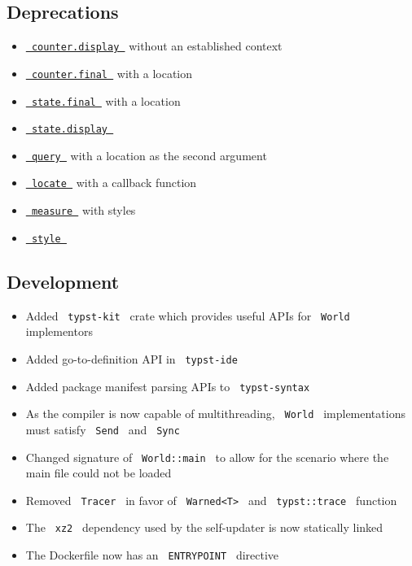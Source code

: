 \subsection{Deprecations}\label{deprecations}

\begin{itemize}
\tightlist
\item
  \href{/docs/reference/introspection/counter/\#definitions-display}{\texttt{\ counter.display\ }}
  without an established context
\item
  \href{/docs/reference/introspection/counter/\#definitions-final}{\texttt{\ counter.final\ }}
  with a location
\item
  \href{/docs/reference/introspection/state/\#definitions-final}{\texttt{\ state.final\ }}
  with a location
\item
  \href{/docs/reference/introspection/state/\#definitions-display}{\texttt{\ state.display\ }}
\item
  \href{/docs/reference/introspection/query/}{\texttt{\ query\ }} with a
  location as the second argument
\item
  \href{/docs/reference/introspection/locate/}{\texttt{\ locate\ }} with
  a callback function
\item
  \href{/docs/reference/layout/measure/}{\texttt{\ measure\ }} with
  styles
\item
  \href{/docs/reference/foundations/style/}{\texttt{\ style\ }}
\end{itemize}

\subsection{Development}\label{development}

\begin{itemize}
\tightlist
\item
  Added \texttt{\ typst-kit\ } crate which provides useful APIs for
  \texttt{\ World\ } implementors
\item
  Added go-to-definition API in \texttt{\ typst-ide\ }
\item
  Added package manifest parsing APIs to \texttt{\ typst-syntax\ }
\item
  As the compiler is now capable of multithreading, \texttt{\ World\ }
  implementations must satisfy \texttt{\ Send\ } and \texttt{\ Sync\ }
\item
  Changed signature of \texttt{\ World::main\ } to allow for the
  scenario where the main file could not be loaded
\item
  Removed \texttt{\ Tracer\ } in favor of
  \texttt{\ Warned\textless{}T\textgreater{}\ } and
  \texttt{\ typst::trace\ } function
\item
  The \texttt{\ xz2\ } dependency used by the self-updater is now
  statically linked
\item
  The Dockerfile now has an \texttt{\ ENTRYPOINT\ } directive
\end{itemize}

